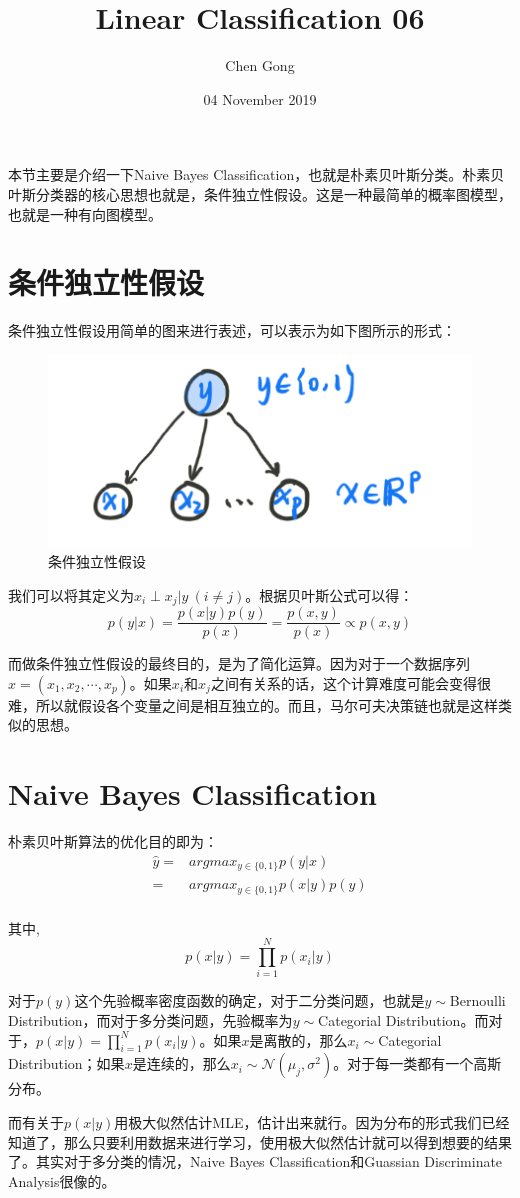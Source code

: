 \documentclass[a4paper]{article}
\title{Linear Classification 06}
\author{Chen Gong}
\date{04 November 2019}
\begin{document}
\maketitle

本节主要是介绍一下Naive Bayes Classification，也就是朴素贝叶斯分类。朴素贝叶斯分类器的核心思想也就是，条件独立性假设。这是一种最简单的概率图模型，也就是一种有向图模型。

\section{条件独立性假设}
条件独立性假设用简单的图来进行表述，可以表示为如下图所示的形式：
\begin{figure}[H]
    \centering
    \includegraphics[width=.55\textwidth]{微信图片_20191104091918.png}
    \caption{条件独立性假设}
    \label{fig:my_label_1}
\end{figure}

我们可以将其定义为$x_i\perp x_j|y\ (i \neq j)$。根据贝叶斯公式可以得：
\begin{equation}
    p(y|x)=\frac{p(x|y)p(y)}{p(x)}=\frac{p(x,y)}{p(x)}\propto p(x,y)
\end{equation}

而做条件独立性假设的最终目的，是为了简化运算。因为对于一个数据序列$x=(x_1,x_2,\cdots,x_p)$。如果$x_i$和$x_j$之间有关系的话，这个计算难度可能会变得很难，所以就假设各个变量之间是相互独立的。而且，马尔可夫决策链也就是这样类似的思想。

\section{Naive Bayes Classification}
朴素贝叶斯算法的优化目的即为：
\begin{equation}
    \begin{split}
        \hat{y} = & argmax_{y\in \{0,1\}}p(y|x) \\
        = & argmax_{y\in \{0,1\}}p(x|y)p(y) \\
    \end{split}
\end{equation}

其中,
\begin{equation}
    p(x|y) = \prod_{i=1}^Np(x_i|y)
\end{equation}

对于$p(y)$这个先验概率密度函数的确定，对于二分类问题，也就是$y\sim$Bernoulli Distribution，而对于多分类问题，先验概率为$y\sim$Categorial Distribution。而对于，$p(x|y) = \prod_{i=1}^Np(x_i|y)$。如果$x$是离散的，那么$x_i\sim$Categorial Distribution；如果$x$是连续的，那么$x_i\sim\mathcal{N}(\mu_j,\sigma^2)$。对于每一类都有一个高斯分布。

而有关于$p(x|y)$用极大似然估计MLE，估计出来就行。因为分布的形式我们已经知道了，那么只要利用数据来进行学习，使用极大似然估计就可以得到想要的结果了。其实对于多分类的情况，Naive Bayes Classification和Guassian Discriminate Analysis很像的。
\end{document}
